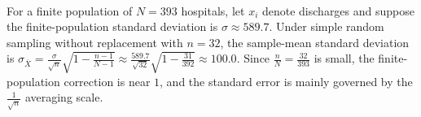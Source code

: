 \begin{example} \label{ex:srs-finite-population-correction-hospitals} \\
For a finite population of $N=393$ hospitals, let $x_i$ denote discharges and suppose the finite-population standard deviation is $\sigma\approx589.7$.
Under simple random sampling without replacement with $n=32$, the sample-mean standard deviation is $\sigma_{\overline{X}}=\frac{\sigma}{\sqrt{n}}\sqrt{1-\frac{n-1}{N-1}}\approx\frac{589.7}{\sqrt{32}}\sqrt{1-\frac{31}{392}}\approx100.0$.
Since $\frac{n}{N}=\frac{32}{393}$ is small, the finite-population correction is near $1$, and the standard error is mainly governed by the $\frac{1}{\sqrt n}$ averaging scale.
\end{example}
